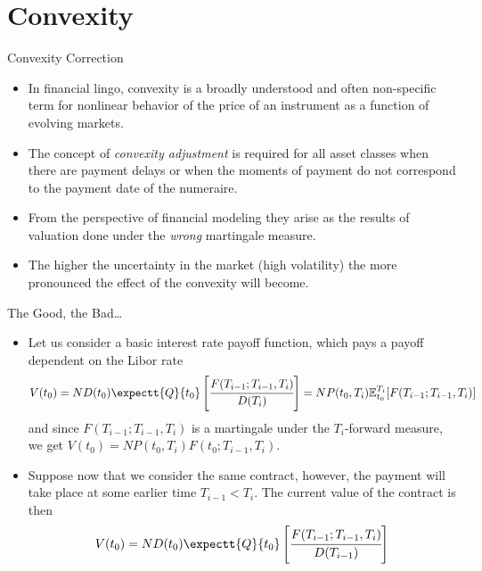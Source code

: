 \documentclass{beamer}
\begin{document}
\section{Convexity}
\begin{frame}{Convexity Correction}
\begin{itemize}
\item 	In financial lingo, convexity is a broadly understood and often non-specific term for nonlinear behavior of the price of an instrument as a function of evolving markets.
\item The concept of \emph{convexity adjustment} is required for all asset
classes when there are payment delays or when the moments of payment do
not correspond to the payment date of the numeraire. %
\item 	From the perspective of financial modeling they arise as the results of valuation done under the \emph{wrong} martingale measure.
\item The higher the uncertainty in the market (high volatility) the more pronounced the effect of the convexity will become.
\end{itemize}
\end{frame}

\begin{frame}{The Good, the Bad\ldots}
\begin{itemize}
\item Let us consider a basic interest rate payoff function, which pays a payoff dependent on the Libor rate
\begin{equation}
V(t_0) = N D(t_0)\expectt{Q}{t_0}\left[\cfrac{F(T_{i-1};T_{i-1},T_i)}{D(T_i)}\right]=
	NP(t_0,T_i)\mathbb{E}^{T_i}_{t_0}[F(T_{i-1};T_{i-1},T_i)]
\end{equation}
and since $F(T_{i-1};T_{i-1}, T_i)$ is a martingale under the $T_i$-forward measure, we get $V(t_0)=NP(t_0,T_i)F(t_0;T_{i-1}, T_i)$.
\item Suppose now that we consider the same contract, however, the payment will take place at some earlier time $T_{i-1} < T_i$. The current value of the contract is then
\begin{equation}
	V(t_0) = N D(t_0)\expectt{Q}{t_0}\left[\cfrac{F(T_{i-1};T_{i-1},T_i)}{D(T_{i-1})}\right]
\end{equation}
\end{itemize}
\end{frame}
\end{document}
